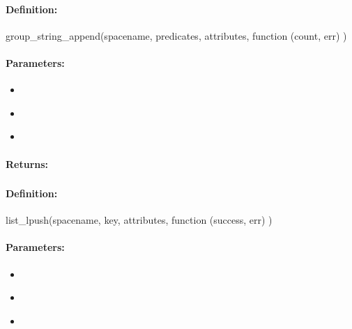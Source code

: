 \paragraph{Definition:}
\begin{javascriptcode}
group_string_append(spacename, predicates, attributes, function (count, err) {})
\end{javascriptcode}
\paragraph{Parameters:}
\begin{itemize}[noitemsep]
\item {}\\

\item {}\\

\item {}\\

\end{itemize}

\paragraph{Returns:}


\pagebreak
\subsubsection{}
\label{api:nodejs:list_lpush}


\paragraph{Definition:}
\begin{javascriptcode}
list_lpush(spacename, key, attributes, function (success, err) {})
\end{javascriptcode}
\paragraph{Parameters:}
\begin{itemize}[noitemsep]
\item {}\\

\item {}\\

\item {}\\

\end{itemize}

